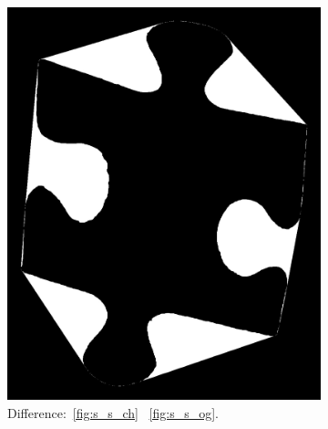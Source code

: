 \documentclass{article}
\begin{document}
\begin{figure}
\begin{subfigure}{0.3\textwidth}
    \includegraphics[width=\linewidth]{pictures/remove_holes_filler_areas.png}
    \caption{Difference:~\ref{fig:s_s_ch} \textminus~\ref{fig:s_s_og}.}
    \label{fig:fig:s_s_og_minus_ch}
  \end{subfigure}
  \vspace{1cm}
  \begin{subfigure}{0.3\textwidth}
    \centering

\end{subfigure}
\end{figure}
\end{document}
